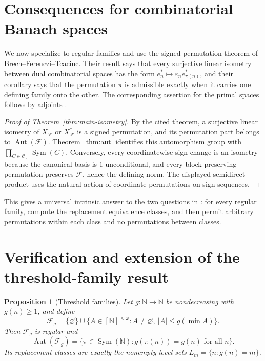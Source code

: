 \documentclass[11pt]{article}
\newtheorem{proposition}[theorem]{Proposition}
\theoremstyle{definition}
\theoremstyle{remark}
\newcommand{\N}{\mathbb N}
\newcommand{\F}{\mathcal F}
\newcommand{\Ccal}{\mathcal C}
\newcommand{\Aut}{\operatorname{Aut}}
\newcommand{\Sym}{\operatorname{Sym}}
\begin{document}
\section{Consequences for combinatorial Banach spaces}

We now specialize to regular families and use the signed-permutation theorem
of Brech--Ferenczi--Tcaciuc.  Their result says that every surjective linear
isometry between dual combinatorial spaces has the form
$e_n^*\mapsto\varepsilon_n e_{\pi(n)}^*$, and their corollary says that the
permutation $\pi$ is admissible exactly when it carries one defining family
onto the other.  The corresponding assertion for the primal spaces follows
by adjoints \cite[Theorem~10 and Corollary~12]{BFT}.

\begin{proof}[Proof of Theorem~\ref{thm:main-isometry}]
By the cited theorem, a surjective linear isometry of $X_{\F}$ or
$X_{\F}^{*}$ is a signed permutation, and its permutation part belongs to
$\Aut(\F)$.  Theorem~\ref{thm:aut} identifies this automorphism group with
$\prod_{C\in\Ccal_{\F}}\Sym(C)$.  Conversely, every coordinatewise sign
change is an isometry because the canonical basis is $1$-unconditional, and
every block-preserving permutation preserves $\F$, hence the defining norm.
The displayed semidirect product uses the natural action of coordinate
permutations on sign sequences.
\end{proof}

This gives a universal intrinsic answer to the two questions in
\cite{BFT}: for every regular family, compute the replacement equivalence
classes, and then permit arbitrary permutations within each class and no
permutations between classes.

\section{Verification and extension of the threshold-family result}
\label{sec:threshold}

\begin{proposition}[Threshold families]\label{prop:threshold}
Let $g:\N\to\N$ be nondecreasing with $g(n)\ge1$, and define
\[
  \F_g=\{\varnothing\}\cup
  \{A\in[\N]^{<\omega}:A\ne\varnothing,
       \ |A|\le g(\min A)\}.
\]
Then $\F_g$ is regular and
\[
  \Aut(\F_g)
  =\{\pi\in\Sym(\N):g(\pi(n))=g(n)\text{ for all }n\}.
  \tag{5.1}\label{eq:threshold-aut}
\]
Its replacement classes are exactly the nonempty level sets
$L_m=\{n:g(n)=m\}$.
\end{proposition}
\end{document}
